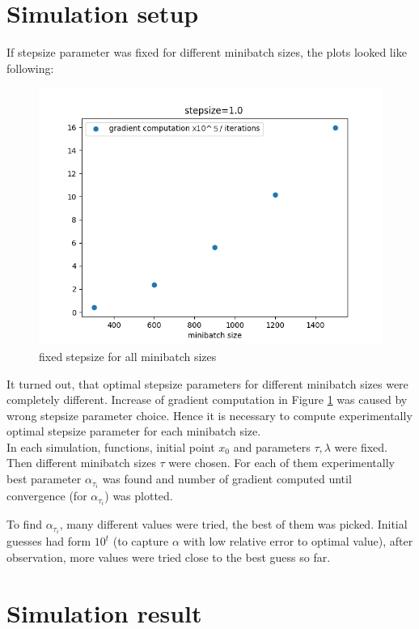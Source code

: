 \documentclass[11pt]{book}
\begin{document}
\section{Simulation setup}

If stepsize parameter was fixed for different minibatch sizes, the plots looked like following:

\begin{figure}[H]
	\centering
	\includegraphics[width=.7\linewidth]{fixed_stepsize.png}
	\caption{fixed stepsize for all minibatch sizes}
	\label{fig:fixed stepsize}
\end{figure}

It turned out, that optimal stepsize parameters for different minibatch sizes were completely different. Increase of gradient computation in Figure \ref{fig:fixed stepsize} was caused by wrong stepsize parameter choice. Hence it is necessary to compute experimentally optimal stepsize parameter for each minibatch size.\\


In each simulation, functions, initial point $x_0$ and parameters $\tau, \lambda$ were fixed. Then different minibatch sizes $\tau$ were chosen. For each of them experimentally best parameter $\alpha_{\tau_i}$ was found and number of gradient computed until convergence (for $\alpha_{\tau_i}$) was plotted. 

To find $\alpha_{\tau_i}$, many different values were tried, the best of them was picked. Initial guesses had form $10^t$ (to capture $\alpha$ with low relative error to optimal value), after observation, more values were tried close to the best guess so far.\\

\section{Simulation result}
\end{document}
